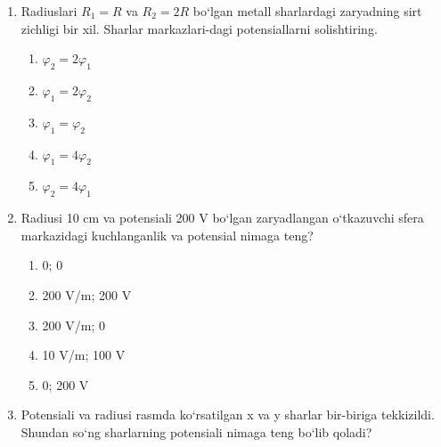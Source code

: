 \begin{enumerate}
    \item Radiuslari $R_1=R$ va $R_2=2R$ bo‘lgan metall sharlardagi zaryadning sirt zichligi bir xil. Sharlar markazlari-dagi potensiallarni solishtiring.
    \begin{enumerate}[label=\Alph*)]
        \item $\varphi_2=2\varphi_1$
        \item $\varphi_1=2\varphi_2$
        \item $\varphi_1=\varphi_2$
        \item $\varphi_1=4\varphi_2$
        \item $\varphi_2=4\varphi_1$
    \end{enumerate}

    \item Radiusi 10 cm va potensiali 200 V bo‘lgan zaryadlangan o‘tkazuvchi sfera markazidagi kuchlanganlik va potensial nimaga teng?
    \begin{enumerate}[label=\Alph*)]
        \item 0; 0
        \item 200 V/m; 200 V
        \item 200 V/m; 0
        \item 10 V/m; 100 V
        \item 0; 200 V
    \end{enumerate}

    \item Potensiali va radiusi rasmda ko‘rsatilgan x va y sharlar bir-biriga tekkizildi. Shundan so‘ng sharlarning potensiali nimaga teng bo‘lib qoladi?

    

\end{enumerate}
